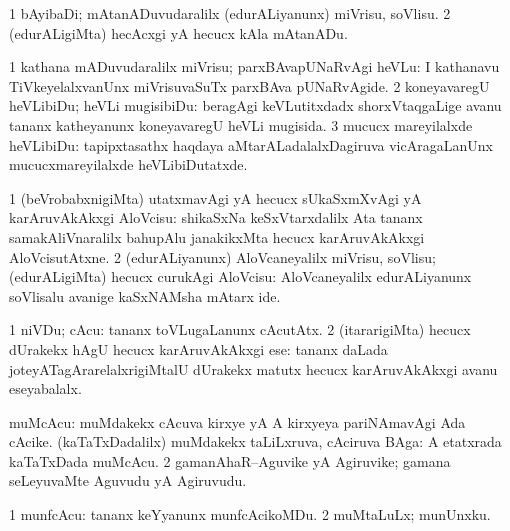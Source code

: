 \bentry
{}
\gl{\sakirx}
\bmng
\bnum
\num{1} bAyibaDi; mAtanADuvudaralilx (edurALiyanunx) miVrisu, soVlisu. 
\num{2} (edurALigiMta) hecAcxgi yA hecucx kAla mAtanADu. 
\enum
\emng
\eentry

\bentry
{}
\gl{\sakirx}
\bmng
\bnum
\num{1} kathana mADuvudaralilx miVrisu; parxBAvapUNaRvAgi heVLu:  I kathanavu TiVkeyelalxvanUnx miVrisuvaSuTx parxBAva pUNaRvAgide. 
\num{2} koneyavaregU heVLibiDu; heVLi mugisibiDu:  beragAgi keVLutitxdadx shorxVtaqgaLige avanu tananx katheyanunx koneyavaregU heVLi mugisida. 
\num{3} mucucx mareyilalxde heVLibiDu:  tapipxtasathx haqdaya aMtarALadalalxDagiruva vicAragaLanUnx mucucxmareyilalxde heVLibiDutatxde. 
\enum
\emng
\eentry

\bentry
{}
\gl{\sakirx}
\bmng
\bnum
\num{1} (beVrobabxnigiMta) utatxmavAgi yA hecucx sUkaSxmXvAgi yA karAruvAkAkxgi AloVcisu:  shikaSxNa keSxVtarxdalilx Ata tananx samakAliVnaralilx bahupAlu janakikxMta hecucx karAruvAkAkxgi AloVcisutAtxne. 
\num{2} (edurALiyanunx) AloVcaneyalilx miVrisu, soVlisu; (edurALigiMta) hecucx curukAgi AloVcisu:  AloVcaneyalilx edurALiyanunx soVlisalu avanige kaSxNAMsha mAtarx ide. 
\enum
\emng
\eentry

\bentry
{}
\gl{\sakirx}
\bmng
\bnum
\num{1} niVDu; cAcu:  tananx toVLugaLanunx cAcutAtx. 
\num{2} (itararigiMta) hecucx dUrakekx hAgU hecucx karAruvAkAkxgi ese:  tananx daLada joteyATagArarelalxrigiMtalU dUrakekx matutx hecucx karAruvAkAkxgi avanu eseyabalalx. 
\enum
\emng
\eentry

\bentry
{}
\gl{\nA}
\bmng
\bnum
{} muMcAcu: 
\banum
{} muMdakekx cAcuva kirxye yA A kirxyeya pariNAmavAgi Ada cAcike. 
 (kaTaTxDadalilx) muMdakekx taLiLxruva, cAciruva BAga:  A etatxrada kaTaTxDada muMcAcu. 
\eanum
\numie
\num{2} gamanAhaR--Aguvike yA Agiruvike; gamana seLeyuvaMte Aguvudu yA Agiruvudu. 
\enum
\emng
\eentry

\bentry
{}
\gl{\sakirx}
\bmng
\bnum
\num{1} munfcAcu:  tananx keYyanunx munfcAcikoMDu.
\num{2} muMtaLuLx; munUnxku. 
\enum
\emng
\eentry

